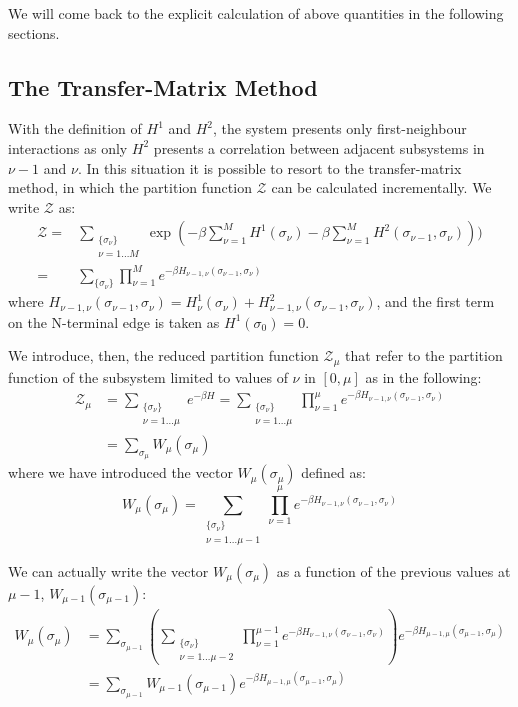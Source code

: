 We will come back to the explicit calculation of above quantities in the
following sections.


\subsection{The Transfer-Matrix Method}
With the definition of $H^1$ and $H^2$, the system presents only first-neighbour
interactions as only $H^2$ presents a correlation between adjacent subsystems in
$\nu-1$ and $\nu$.
In this situation it is possible to resort to the transfer-matrix method,
in which the partition function $\mathcal{Z}$ can be calculated incrementally.
We write  $\mathcal{Z}$  as:
\begin{align}
\mathcal{Z} =& \sum_{\substack{\{\sigma_\nu\}\\\nu=1\dots M}}
\exp(-\beta \sum_{\nu=1}^M H^1(\sigma_\nu) -\beta \sum_{\nu=1}^M
H^2(\sigma_{\nu-1},\sigma_\nu)))\\
=&
\sum_{\lbrace\sigma_\nu\rbrace} 
\prod_{\nu=1}^M
{ e^{-\beta H_{\nu-1,\nu}(\sigma_{\nu-1},\sigma_\nu)}
}
\label{eq:z}
\end{align}
where $H_{\nu-1,\nu}(\sigma_{\nu-1},\sigma_\nu)=
H^1_\nu(\sigma_\nu)+H^2_{\nu-1,\nu}(\sigma_{\nu-1},\sigma_\nu)$, and the first
term on the N-terminal edge is taken as $H^1(\sigma_0)=0$.

We introduce, then, the reduced partition function $\mathcal Z_\mu$ that refer to the
partition function of the
subsystem limited to values of $\nu$ in $[0,\mu]$ as in the following:
\begin{align}
\mathcal Z_\mu &=
\sum_{\substack{\{\sigma_\nu\}\\\nu=1\dots\mu}} e^{-\beta H}
=
\sum_{\substack{\{\sigma_\nu\}\\\nu=1\dots\mu}} \prod_{\nu=1}^{\mu} e^{-\beta
H_{\nu-1,\nu}
(\sigma_{\nu-1},\sigma_\nu)}
\\&=
\sum_{\sigma_\mu}W_\mu(\sigma_\mu)
\end{align}
where we have introduced the vector $W_\mu(\sigma_\mu)$ defined as: 
\begin{equation}
W_\mu (\sigma_\mu)=
\sum_{\substack{\{\sigma_\nu\}\\\nu=1\dots\mu-1}}
\prod_{\nu=1}^\mu
e^{-\beta H_{\nu-1,\nu}(\sigma_{\nu-1},\sigma_\nu)}
\end{equation}

We can actually write the vector $W_\mu(\sigma_\mu)$ as a function of the previous
values at $\mu-1$, $W_{\mu-1}(\sigma_{\mu-1})$:
\begin{align}
W_\mu(\sigma_\mu)
&=
\sum_{\sigma_{\mu-1}}
\left(
\sum_{\substack{\{\sigma_\nu\}\\\nu=1\dots\mu-2}} \prod_{\nu=1}^{\mu-1}
e^{-\beta H_{\nu-1,\nu}(\sigma_{\nu-1},\sigma_\nu)}\right)
e^{-\beta H_{\mu-1,\mu}(\sigma_{\mu-1},\sigma_\mu)}
\nonumber\\
&=
\sum_{\sigma_{\mu-1}}
W_{\mu-1}(\sigma_{\mu-1})
e^{-\beta H_{\mu-1,\mu}(\sigma_{\mu-1},\sigma_\mu)}
\end{align}

